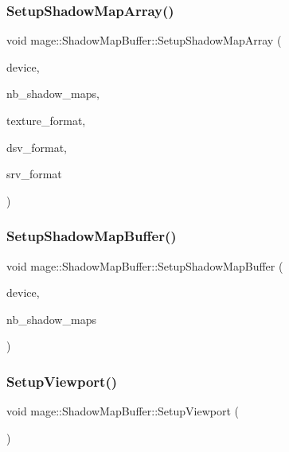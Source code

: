 \subsubsection{\texorpdfstring{Setup\+Shadow\+Map\+Array()}{SetupShadowMapArray()}}
{\footnotesize\ttfamily void mage\+::\+Shadow\+Map\+Buffer\+::\+Setup\+Shadow\+Map\+Array (\begin{DoxyParamCaption}\item[{I\+D3\+D11\+Device5 $\ast$}]{device,  }\item[{size\+\_\+t}]{nb\+\_\+shadow\+\_\+maps,  }\item[{D\+X\+G\+I\+\_\+\+F\+O\+R\+M\+AT}]{texture\+\_\+format,  }\item[{D\+X\+G\+I\+\_\+\+F\+O\+R\+M\+AT}]{dsv\+\_\+format,  }\item[{D\+X\+G\+I\+\_\+\+F\+O\+R\+M\+AT}]{srv\+\_\+format }\end{DoxyParamCaption})\hspace{0.3cm}{\ttfamily [private]}}

\hypertarget{structmage_1_1_shadow_map_buffer_af1aa6aeab0c71dfd52b97fa7167cac17}{}\label{structmage_1_1_shadow_map_buffer_af1aa6aeab0c71dfd52b97fa7167cac17} 
\subsubsection{\texorpdfstring{Setup\+Shadow\+Map\+Buffer()}{SetupShadowMapBuffer()}}
{\footnotesize\ttfamily void mage\+::\+Shadow\+Map\+Buffer\+::\+Setup\+Shadow\+Map\+Buffer (\begin{DoxyParamCaption}\item[{I\+D3\+D11\+Device5 $\ast$}]{device,  }\item[{size\+\_\+t}]{nb\+\_\+shadow\+\_\+maps }\end{DoxyParamCaption})\hspace{0.3cm}{\ttfamily [private]}}

\hypertarget{structmage_1_1_shadow_map_buffer_aacabad92fb9c0bf81cf2f3c1fbae9f13}{}\label{structmage_1_1_shadow_map_buffer_aacabad92fb9c0bf81cf2f3c1fbae9f13} 
\subsubsection{\texorpdfstring{Setup\+Viewport()}{SetupViewport()}}
{\footnotesize\ttfamily void mage\+::\+Shadow\+Map\+Buffer\+::\+Setup\+Viewport (\begin{DoxyParamCaption}{ }\end{DoxyParamCaption})\hspace{0.3cm}{\ttfamily [private]}}



